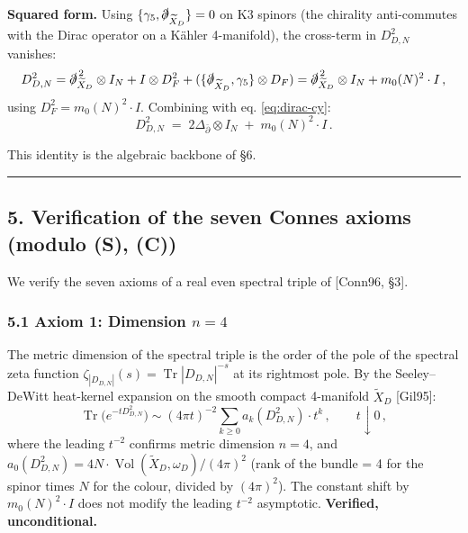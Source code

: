 \documentclass[
  11pt,
  a4paper,
]{amsart}
\begin{document}
\textbf{Squared form.} Using \(\{\gamma_5, \slashed{\partial}_{\widetilde{X}_D}\} = 0\)
on K3 spinors (the chirality anti-commutes with the Dirac operator on a Kähler
4-manifold), the cross-term in \(D_{D,N}^2\) vanishes:
\[
D_{D,N}^2
= \slashed{\partial}_{\widetilde{X}_D}^{\,2} \otimes I_N + I \otimes D_F^2 + (\{\slashed{\partial}_{\widetilde{X}_D}, \gamma_5\} \otimes D_F)
= \slashed{\partial}_{\widetilde{X}_D}^{\,2} \otimes I_N + m_0(N)^2 \cdot I\,,
\]
using \(D_F^2 = m_0(N)^2 \cdot I\). Combining with eq. \eqref{eq:dirac-cy}:
\begin{equation}\label{eq:Dsq}
\boxed{\;D_{D,N}^2 \;=\; 2\Delta_{\bar\partial} \otimes I_N \;+\; m_0(N)^2 \cdot I\,.\;}
\end{equation}

This identity is the algebraic backbone of §6.

\begin{center}\rule{0.5\linewidth}{0.5pt}\end{center}

\hypertarget{verification-of-the-seven-connes-axioms-modulo-s-c}{%
\subsection{5. Verification of the seven Connes axioms (modulo (S), (C))}\label{verification-of-the-seven-connes-axioms-modulo-s-c}}

We verify the seven axioms of a real even spectral triple of {[}Conn96, §3{]}.

\hypertarget{axiom-1-dimension-n-4}{%
\subsubsection{\texorpdfstring{5.1 Axiom 1: Dimension \(n = 4\)}{5.1 Axiom 1: Dimension n = 4}}\label{axiom-1-dimension-n-4}}

The metric dimension of the spectral triple is the order of the pole of the
spectral zeta function \(\zeta_{|D_{D,N}|}(s) = \operatorname{Tr} |D_{D,N}|^{-s}\)
at its rightmost pole. By the Seeley--DeWitt heat-kernel expansion on the
smooth compact 4-manifold \(\widetilde{X}_D\) {[}Gil95{]}:
\[
\operatorname{Tr}\bigl(e^{-t D_{D,N}^2}\bigr) \sim (4\pi t)^{-2} \sum_{k \ge 0} a_k(D_{D,N}^2) \cdot t^k\,, \qquad t \downarrow 0\,,
\]
where the leading \(t^{-2}\) confirms metric dimension \(n = 4\), and
\(a_0(D_{D,N}^2) = 4N \cdot \operatorname{Vol}(\widetilde{X}_D, \omega_D) / (4\pi)^2\)
(rank of the bundle = 4 for the spinor times \(N\) for the colour, divided by
\((4\pi)^2\)). The constant shift by \(m_0(N)^2 \cdot I\) does not modify the
leading \(t^{-2}\) asymptotic. \textbf{Verified, unconditional.}
\end{document}
